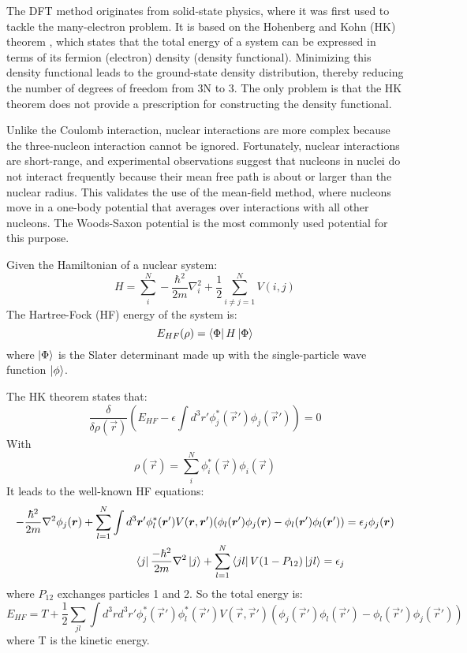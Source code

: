 The DFT method originates from solid-state physics, where it was first used to 
tackle the many-electron problem. It is based on the Hohenberg and Kohn (HK) theorem \cite{PhysRevC.57.3430}, 
which states that the total energy of a system can be expressed in terms of its
fermion (electron) density (density functional).
Minimizing this density functional leads to the ground-state density distribution, 
thereby reducing the number of degrees of freedom from 3N to 3. The only problem 
is that the HK theorem does not provide a prescription for constructing the density functional.

Unlike the Coulomb interaction, nuclear interactions are more complex because 
the three-nucleon interaction cannot be ignored. Fortunately, nuclear interactions
are short-range, and experimental observations suggest that nucleons in nuclei
do not interact frequently because their mean free path is about or larger than 
the nuclear radius. This validates the use of the mean-field method, where nucleons
move in a one-body potential that averages over interactions with all other nucleons. 
The Woods-Saxon potential is the most commonly used potential for this purpose.

Given the Hamiltonian of a nuclear system:
\begin{equation}
    H = \sum_i^N -\frac{\hbar^2}{2m}\nabla_i^2 + \frac{1}{2} \sum_{i\neq j=1}^N V(i, j)
\end{equation}
The Hartree-Fock (HF) energy of the system is:
\begin{equation}
    E_{HF}(\rho) = \bra{\Phi} H \ket{\Phi}
\end{equation}
where $\ket{\Phi}$ is the Slater determinant made up with the single-particle wave 
function $\ket{\phi}$.

The HK theorem states that:
\begin{equation}
    \frac{\delta}{\delta\rho(\vec{r})} \left( E_{HF} - \epsilon\int d^3r' \phi^*_j(\vec{r}')\phi_j(\vec{r}') \right) = 0
\end{equation}
With
\begin{equation}
    \rho(\vec{r}) = \sum_i^N \phi_i^*(\vec{r})\phi_i(\vec{r})
\end{equation}
It leads to the well-known HF equations:
\begin{equation}
    \begin{aligned}
	-\frac{\hbar^2}{2m}\nabla^2\phi_j(\boldsymbol{r}) 
	+ \sum_{l=1}^N \int d^3\boldsymbol{r}' \phi^*_l(\boldsymbol{r}') V(\boldsymbol{r}, \boldsymbol{r}') (\phi_l(\boldsymbol{r}')\phi_j(\boldsymbol{r}) - \phi_l(\boldsymbol{r}')\phi_l(\boldsymbol{r}'))
	&= \epsilon_j\phi_j(\boldsymbol{r})	\\
	\bra{j}\frac{-\hbar^2}{2m}\nabla^2\ket{j} + \sum_{l=1}^N \bra{jl}V(1-P_{12})\ket{jl} = \epsilon_j
    \end{aligned}
\end{equation}
where $P_{12}$ exchanges particles 1 and 2. So the total energy is:
\begin{equation}
    E_{HF} = T + \frac{1}{2}\sum_{jl} \int d^3r d^3r' \phi_j^*(\vec{r}')\phi_l^*(\vec{r}')V(\vec{r}, \vec{r}') (\phi_j(\vec{r}')\phi_l(\vec{r}') - \phi_l(\vec{r}')\phi_j(\vec{r}'))
\end{equation}
where T is the kinetic energy.

